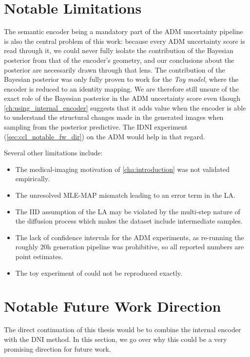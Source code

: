 \section{Notable Limitations}

The semantic encoder being a mandatory part of the \acs{ADM} uncertainty pipeline is also the central problem of this work: because every \acs{ADM} uncertainty score is read through it, we could never fully isolate the contribution of the Bayesian posterior from that of the encoder's geometry, and our conclusions about the posterior are necessarily drawn through that lens. The contribution of the Bayesian posterior was only fully proven to work for the \emph{Toy model}, where the encoder is reduced to an identity mapping. We are therefore still unsure of the exact role of the Bayesian posterior in the \acs{ADM} uncertainty score even though \autoref{ch:using_internal_encoder} suggests that it adds value when the encoder is able to understand the structural changes made in the generated images when sampling from the posterior predictive. The \acs{IDNI} experiment (\autoref{sec:ccl_notable_fw_dir}) on the \acs{ADM} would help in that regard. 

Several other limitations include:

\begin{itemize}
    \item The medical-imaging motivation of \autoref{cha:introduction} was not validated empirically.
    \item The unresolved \acs{MLE}-\acs{MAP} mismatch leading to an error term in the \acs{LA}.
    \item The \acs{IID} assumption of the \acs{LA} may be violated by the multi-step nature of the diffusion process which makes the dataset include intermediate samples.
    \item The lack of confidence intervals for the \acs{ADM} experiments, as re-running the roughly 20h generation pipeline was prohibitive, so all reported numbers are point estimates.
    \item The toy experiment of \cite{jazbec_generative_2025} could not be reproduced exactly.
\end{itemize}

\section{Notable Future Work Direction}
\label{sec:ccl_notable_fw_dir}

The direct continuation of this thesis would be to combine the internal encoder with the \acs{DNI} method. In this section, we go over why this could be a very promising direction for future work.

